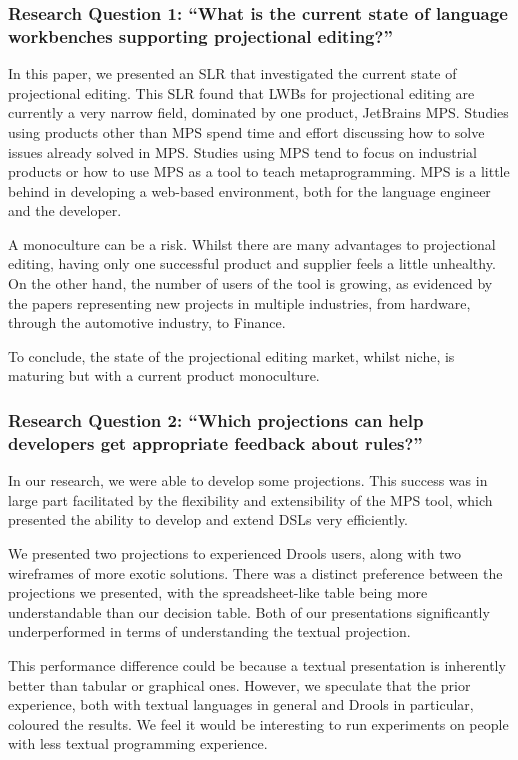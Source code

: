 \subsubsection{Research Question 1: ``What is the current state of language workbenches supporting projectional editing?''}
In this paper, we presented an SLR that investigated the current state of projectional editing.
This SLR found that LWBs for projectional editing are currently a very narrow field, dominated by one product, JetBrains MPS.
Studies using products other than MPS spend time and effort discussing how to solve issues already solved in MPS.
Studies using MPS tend to focus on industrial products or how to use MPS as a tool to teach metaprogramming.
MPS is a little behind in developing a web-based environment, both for the language engineer and the developer.

A monoculture can be a risk.
Whilst there are many advantages to projectional editing, having only one successful product and supplier feels a little unhealthy.
On the other hand, the number of users of the tool is growing, as evidenced by the papers representing new projects in multiple industries, from hardware, through the automotive industry, to Finance.

To conclude, the state of the projectional editing market, whilst niche, is maturing but with a current product monoculture.

\subsubsection{Research Question 2: ``Which projections can help developers get appropriate feedback about rules?''}

In our research, we were able to develop some projections.  
This success was in large part facilitated by the flexibility and extensibility of the MPS tool, which presented the ability to develop and extend DSLs very efficiently.

We presented two projections to experienced Drools users, along with two wireframes of more exotic solutions.
There was a distinct preference between the projections we presented, with the spreadsheet-like table being more understandable than our decision table.
Both of our presentations significantly underperformed in terms of understanding the textual projection.

This performance difference could be because a textual presentation is inherently better than tabular or graphical ones.
However, we speculate that the prior experience, both with textual languages in general and Drools in particular, coloured the results.
We feel it would be interesting to run experiments on people with less textual programming experience.


